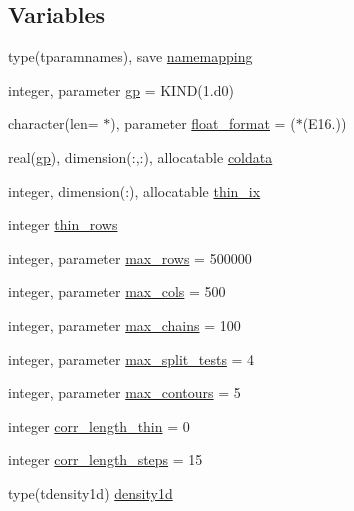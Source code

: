 \subsection*{Variables}
\begin{DoxyCompactItemize}
\item 
type(tparamnames), save \mbox{\hyperlink{namespacemcsamples_ab0b5f836670f80c8acfa3374709ddc9b}{namemapping}}
\item 
integer, parameter \mbox{\hyperlink{namespacemcsamples_a423ddd0f2de0560617b74a17231275e0}{gp}} = K\+I\+ND(1.d0)
\item 
character(len= $\ast$), parameter \mbox{\hyperlink{namespacemcsamples_a1d5c81cfc6a6d2a9f25c250cf8359142}{float\+\_\+format}} = \textquotesingle{}($\ast$(E16.))\textquotesingle{}
\item 
real(\mbox{\hyperlink{namespacemcsamples_a423ddd0f2de0560617b74a17231275e0}{gp}}), dimension(\+:,\+:), allocatable \mbox{\hyperlink{namespacemcsamples_a1f7790a8989ae24a32dcef594163cfd6}{coldata}}
\item 
integer, dimension(\+:), allocatable \mbox{\hyperlink{namespacemcsamples_a68af0f07bf91f81304b0a3c46c669ffc}{thin\+\_\+ix}}
\item 
integer \mbox{\hyperlink{namespacemcsamples_a868898642c4ad498fccad75315810550}{thin\+\_\+rows}}
\item 
integer, parameter \mbox{\hyperlink{namespacemcsamples_a11a673041be4c2131b8dc7a2806e6a04}{max\+\_\+rows}} = 500000
\item 
integer, parameter \mbox{\hyperlink{namespacemcsamples_ae8386bad918d8af8d203683c01d5818c}{max\+\_\+cols}} = 500
\item 
integer, parameter \mbox{\hyperlink{namespacemcsamples_a204c829ca43df2c6d41335156e6786ee}{max\+\_\+chains}} = 100
\item 
integer, parameter \mbox{\hyperlink{namespacemcsamples_aecb93fc58e3823802a4eabc86659a889}{max\+\_\+split\+\_\+tests}} = 4
\item 
integer, parameter \mbox{\hyperlink{namespacemcsamples_a878ea2f4d47feda9ed7a1701aabfb0d1}{max\+\_\+contours}} = 5
\item 
integer \mbox{\hyperlink{namespacemcsamples_af8a6d674d091942c7820c37ad6795f6b}{corr\+\_\+length\+\_\+thin}} = 0
\item 
integer \mbox{\hyperlink{namespacemcsamples_a7cabc6db7f9125c0af7b6de3032567f1}{corr\+\_\+length\+\_\+steps}} = 15
\item 
type(tdensity1d) \mbox{\hyperlink{namespacemcsamples_aa7682e36ef34bef4b8112f058f435415}{density1d}}

\end{DoxyCompactItemize}
